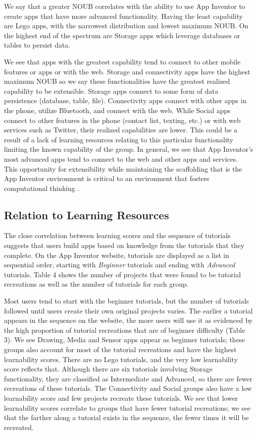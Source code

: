 \documentclass[conference]{IEEEtran}
\begin{document}
We say that a greater NOUB correlates with the ability to use App Inventor to create apps that have more advanced functionality. Having the least capability are Lego apps, with the narrowest distribution and lowest maximum NOUB. On the highest end of the spectrum are Storage apps which leverage databases or tables to persist data.

We see that apps with the greatest capability tend to connect to other mobile features or apps or with the web. Storage and connectivity apps have the highest maximum NOUB so we say these functionalities have the greatest realized capability to be extensible. Storage apps connect to some form of data persistence (database, table, file). Connectivity apps connect with other apps in the phone, utilize Bluetooth, and connect with the web. While Social apps connect to other features in the phone (contact list, texting, etc.) or with web services such as Twitter, their realized capabilities are lower. This could be a result of a lack of learning resources relating to this particular functionality limiting the known capability of the group. In general, we see that App Inventor’s most advanced apps tend to connect to the web and other apps and services. This opportunity for extensibility while maintaining the scaffolding that is the App Inventor environment is critical to an environment that fosters computational thinking \cite{checklist:repenning}.

\subsection{Relation to Learning Resources}
The close correlation between learning scores and the sequence of tutorials suggests that users build apps based on knowledge from the tutorials that they complete. On the App Inventor website, tutorials are displayed as a list in sequential order, starting with \emph{Beginner} tutorials and ending with \emph{Advanced} tutorials. Table 4 shows the number of projects that were found to be tutorial recreations as well as the number of tutorials for each group.

Most users tend to start with the beginner tutorials, but the number of tutorials followed until users create their own original projects varies. The earlier a tutorial appears in the sequence on the website, the more users will use it as evidenced by the high proportion of tutorial recreations that are of beginner difficulty (Table 3). We see Drawing, Media and Sensor apps appear as beginner tutorials; these groups also account for most of the tutorial recreations and have the highest learnability scores. There are no Lego tutorials, and the very low learnability score reflects that. Although there are six tutorials involving Storage functionality, they are classified as Intermediate and Advanced, so there are fewer recreations of these tutorials. The Connectivity and Social groups also have a low learnability score and few projects recreate these tutorials. We see that lower learnability scores correlate to groups that have fewer tutorial recreations; we see that the farther along a tutorial exists in the sequence, the fewer times it will be recreated.
\end{document}
